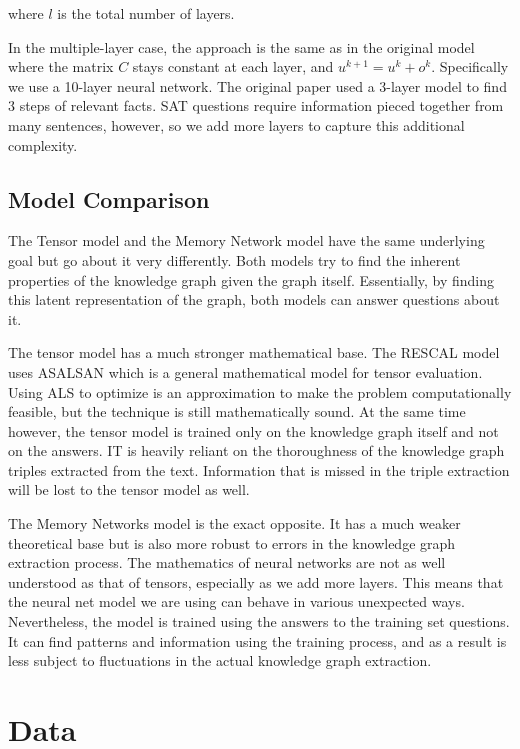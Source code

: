 \documentclass[pageno]{final_paper}
\begin{document}
where $l$ is the total number of layers.

In the multiple-layer case, the approach is the same as in the original model
where the matrix $C$ stays constant at each layer, and $u^{k+1} = u^k + o^k$.
Specifically we use a 10-layer neural network. The original paper used a 3-layer
model to find 3 steps of relevant facts. SAT questions require information
pieced together from many sentences, however, so we add more layers to capture
this additional complexity.

\subsection{Model Comparison}
\label{Model Comparison}

The Tensor model and the Memory Network model have the same underlying goal but
go about it very differently. Both models try to find the inherent properties
of the knowledge graph given the graph itself. Essentially, by finding this
latent representation of the graph, both models can answer questions about it.

The tensor model has a much stronger mathematical base. The RESCAL model uses
ASALSAN \cite{Bader2007} which is a general mathematical model for tensor
evaluation. Using ALS to optimize is an approximation to make the problem
computationally feasible, but the technique is still mathematically sound. At
the same time however, the tensor model is trained only on the knowledge graph
itself and not on the answers. IT is heavily reliant on the thoroughness of the
knowledge graph triples extracted from the text. Information that is missed in
the triple extraction will be lost to the tensor model as well.

The Memory Networks model is the exact opposite. It has a much weaker
theoretical base but is also more robust to errors in the knowledge graph
extraction process. The mathematics of neural networks are not as well
understood as that of tensors, especially as we add more layers. This means that
the neural net model we are using can behave in various unexpected ways.
Nevertheless, the model is trained using the answers to the training set
questions. It can find patterns and information using the training process, and
as a result is less subject to fluctuations in the actual knowledge graph
extraction.

\section{Data}
\label{Data}
\end{document}
